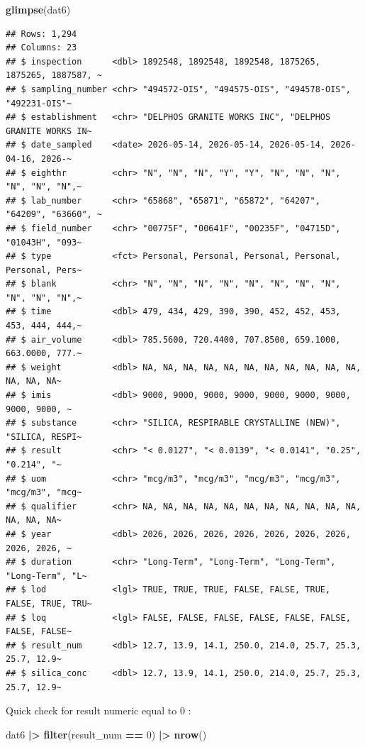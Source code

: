 \documentclass[
]{article}
\newenvironment{Shaded}{\begin{snugshade}}{\end{snugshade}}
\newcommand{\DecValTok}[1]{\textcolor[rgb]{0.00,0.00,0.81}{#1}}
\newcommand{\FunctionTok}[1]{\textcolor[rgb]{0.13,0.29,0.53}{\textbf{#1}}}
\newcommand{\NormalTok}[1]{#1}
\newcommand{\SpecialCharTok}[1]{\textcolor[rgb]{0.81,0.36,0.00}{\textbf{#1}}}
\begin{document}
\begin{Shaded}
\begin{Highlighting}[]
\FunctionTok{glimpse}\NormalTok{(dat6) }
\end{Highlighting}
\end{Shaded}

\begin{verbatim}
## Rows: 1,294
## Columns: 23
## $ inspection      <dbl> 1892548, 1892548, 1892548, 1875265, 1875265, 1887587, ~
## $ sampling_number <chr> "494572-OIS", "494575-OIS", "494578-OIS", "492231-OIS"~
## $ establishment   <chr> "DELPHOS GRANITE WORKS INC", "DELPHOS GRANITE WORKS IN~
## $ date_sampled    <date> 2026-05-14, 2026-05-14, 2026-05-14, 2026-04-16, 2026-~
## $ eighthr         <chr> "N", "N", "N", "Y", "Y", "N", "N", "N", "N", "N", "N",~
## $ lab_number      <chr> "65868", "65871", "65872", "64207", "64209", "63660", ~
## $ field_number    <chr> "00775F", "00641F", "00235F", "04715D", "01043H", "093~
## $ type            <fct> Personal, Personal, Personal, Personal, Personal, Pers~
## $ blank           <chr> "N", "N", "N", "N", "N", "N", "N", "N", "N", "N", "N",~
## $ time            <dbl> 479, 434, 429, 390, 390, 452, 452, 453, 453, 444, 444,~
## $ air_volume      <dbl> 785.5600, 720.4400, 707.8500, 659.1000, 663.0000, 777.~
## $ weight          <dbl> NA, NA, NA, NA, NA, NA, NA, NA, NA, NA, NA, NA, NA, NA~
## $ imis            <dbl> 9000, 9000, 9000, 9000, 9000, 9000, 9000, 9000, 9000, ~
## $ substance       <chr> "SILICA, RESPIRABLE CRYSTALLINE (NEW)", "SILICA, RESPI~
## $ result          <chr> "< 0.0127", "< 0.0139", "< 0.0141", "0.25", "0.214", "~
## $ uom             <chr> "mcg/m3", "mcg/m3", "mcg/m3", "mcg/m3", "mcg/m3", "mcg~
## $ qualifier       <chr> NA, NA, NA, NA, NA, NA, NA, NA, NA, NA, NA, NA, NA, NA~
## $ year            <dbl> 2026, 2026, 2026, 2026, 2026, 2026, 2026, 2026, 2026, ~
## $ duration        <chr> "Long-Term", "Long-Term", "Long-Term", "Long-Term", "L~
## $ lod             <lgl> TRUE, TRUE, TRUE, FALSE, FALSE, TRUE, FALSE, TRUE, TRU~
## $ loq             <lgl> FALSE, FALSE, FALSE, FALSE, FALSE, FALSE, FALSE, FALSE~
## $ result_num      <dbl> 12.7, 13.9, 14.1, 250.0, 214.0, 25.7, 25.3, 25.7, 12.9~
## $ silica_conc     <dbl> 12.7, 13.9, 14.1, 250.0, 214.0, 25.7, 25.3, 25.7, 12.9~
\end{verbatim}

Quick check for result numeric equal to 0 :

\begin{Shaded}
\begin{Highlighting}[]
\NormalTok{dat6 }\SpecialCharTok{|\textgreater{}} 
  \FunctionTok{filter}\NormalTok{(result\_num }\SpecialCharTok{==} \DecValTok{0}\NormalTok{) }\SpecialCharTok{|\textgreater{}} 
  \FunctionTok{nrow}\NormalTok{() }
\end{Highlighting}
\end{Shaded}
\end{document}
